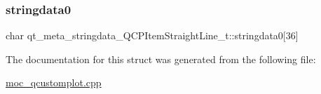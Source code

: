 \subsubsection{\texorpdfstring{stringdata0}{stringdata0}}
{\footnotesize\ttfamily char qt\+\_\+meta\+\_\+stringdata\+\_\+\+Q\+C\+P\+Item\+Straight\+Line\+\_\+t\+::stringdata0\mbox{[}36\mbox{]}}



The documentation for this struct was generated from the following file\+:\begin{DoxyCompactItemize}
\item 
\mbox{\hyperlink{moc__qcustomplot_8cpp}{moc\+\_\+qcustomplot.\+cpp}}\end{DoxyCompactItemize}
